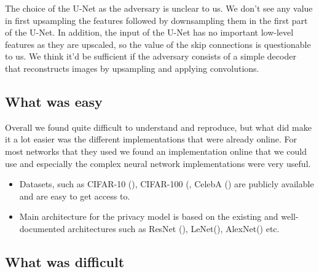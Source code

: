The choice of the U-Net as the adversary is unclear to us. We don't see any value in first upsampling the features followed by downsampling them in the first part of the U-Net. In addition, the input of the U-Net has no important low-level features as they are upscaled, so the value of the skip connections is questionable to us. We think it'd be sufficient if the adversary consists of a simple decoder that reconstructs images by upsampling and applying convolutions.

\subsection{What was easy}


Overall we found \cite{xiang2020interpretable} quite difficult to understand and reproduce, but what did make it a lot easier was the different implementations that were already online. For most networks that they used we found an implementation online that we could use and especially the complex neural network implementations were very useful. 

\begin{itemize}
    \item Datasets, such as CIFAR-10 (\cite{cifar10}), CIFAR-100 (\cite{cifar100}, CelebA (\cite{CelebA}) are publicly available and are easy to get access to.
    \item Main architecture for the privacy model is based on the existing and well-documented architectures such as ResNet (\cite{DBLP:journals/corr/HeZRS15}), LeNet(\cite{lecun1998gradient}), AlexNet(\cite{AlexNet}) etc.
\end{itemize}

\subsection{What was difficult}

